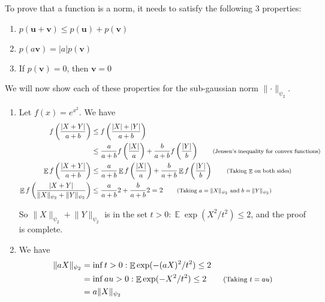 \documentclass[11pt]{article}
\newenvironment{exercise}[2][Exercise]{\begin{trivlist}
\item[\hskip \labelsep {\bfseries #1}\hskip \labelsep {\bfseries #2.}]}{\end{trivlist}}
\newenvironment{solution}[1][Solution]{\begin{trivlist}
\item[\hskip \labelsep {\bfseries #1}\hskip \labelsep]}{\end{trivlist}}
\DeclareMathOperator*{\E}{\mathbb{E}}
\newcommand*{\annot}[1]{\tag*{\footnotesize{(#1)}}}
\begin{document}
\begin{exercise}{2.5.7}
\end{exercise}

\begin{solution}
To prove that a function is a norm, it needs to satisfy the following 3 properties:
\begin{enumerate}
\item $p(\mathbf{u}+\mathbf{v})\leq p(\mathbf{u})+p(\mathbf{v})$
\item $p(a\mathbf{v}) = |a|p(\mathbf{v})$
\item If $p(\mathbf{v})=0$, then $\mathbf{v}=0$
\end{enumerate}

We will now show each of these properties for the sub-gaussian norm $\lVert \cdot \rVert_{\psi_2}$.

\begin{enumerate}
\item Let $f(x) = e^{x^2}$. We have
\begin{align*}
f\left( \frac{\vert X+Y \vert}{a+b} \right) &\leq f\left( \frac{\vert X \vert + \vert Y \vert}{a+b} \right) \\
	&\leq \frac{a}{a+b}f\left( \frac{|X|}{a}\right) + \frac{b}{a+b}f\left( \frac{|Y|}{b}\right) \annot{Jensen's inequality for convex functions}\\
\E f\left( \frac{\vert X+Y \vert}{a+b} \right) &\leq \frac{a}{a+b}\E f\left( \frac{|X|}{a}\right) + \frac{b}{a+b}\E f\left( \frac{|Y|}{b}\right) \annot{Taking $\E$ on both sides}\\
\E f\left( \frac{\vert X+Y \vert}{\lVert X \rVert_{\psi_2}+\lVert Y \rVert_{\psi_2}} \right) &\leq \frac{a}{a+b}2 + \frac{b}{a+b}2 = 2 \annot{Taking $a= \lVert X \rVert_{\psi_2}$ and $b = \lVert Y \rVert_{\psi_2}$}\\
\end{align*}

So $\lVert X \rVert_{\psi_2} + \lVert Y \rVert_{\psi_2}$ is in the set ${t>0: \E \exp(X^2/t^2)}\leq 2$, and the proof is complete.

\item We have
\begin{align*}
\lVert aX \rVert_{\psi_2} &= \inf{t>0: \E\exp(-(aX)^2/t^2)\leq 2} \\
	&= \inf {au>0: \E\exp(-X^2/t^2)\leq 2} \annot{Taking $t=au$} \\
	&= a\lVert X \rVert_{\psi_2}
\end{align*}


\end{enumerate}
\end{solution}
\end{document}

